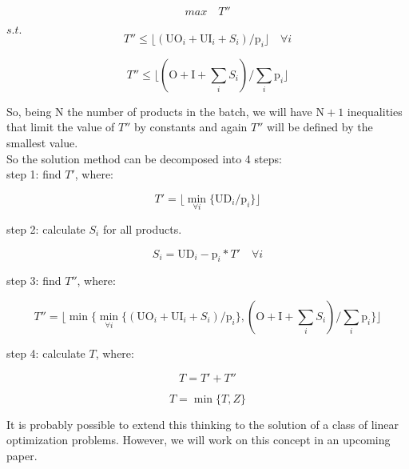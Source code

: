 \documentclass[preprint,12pt,authoryear]{elsarticle}
\begin{document}
\begin{equation}
max \quad T''
\end{equation}

$s.t.$ \\

\begin{equation}
T'' \leq \lfloor{(\textrm{UO}_i + \textrm{UI}_i + S_i) / \textrm{p}_i}\rfloor  \quad \forall i
\end{equation}

\begin{equation}
T'' \leq \lfloor{(\textrm{O} + \textrm{I} + \sum_i {S_i}) / \sum_i {\textrm{p}_i}}\rfloor
\end{equation}

So, being $\textrm{N}$ the number of products in the batch, we will have $\textrm{N}+1$ inequalities that limit the value of $T''$ by constants and again $T''$ will be defined by the smallest value. \\

So the solution method can be decomposed into 4 steps: \\

step 1: find $T'$, where:

\begin{equation}
T' = \lfloor{\min_{\forall i} \{\textrm{UD}_i / \textrm{p}_i\}}\rfloor
\end{equation}

step 2: calculate $S_i$ for all products.

\begin{equation}
\label{eq:unmet}
S_i = \textrm{UD}_i - \textrm{p}_i * T' \quad \forall i
\end{equation}

step 3: find $T''$, where:

\begin{equation}
T'' = \lfloor{\min \{\min_{\forall i} \{(\textrm{UO}_i + \textrm{UI}_i + S_i) / \textrm{p}_i\},(\textrm{O} + \textrm{I} + \sum_i {S_i}) / \sum_i {\textrm{p}_i}\}}\rfloor
\end{equation}

step 4: calculate $T$, where: 

\begin{equation}
T = T' + T''
\end{equation}

\begin{equation}
T = \min \{T , Z\}
\end{equation}

It is probably possible to extend this thinking to the solution of a class of linear optimization problems. However, we will work on this concept in an upcoming paper. \\
\end{document}
